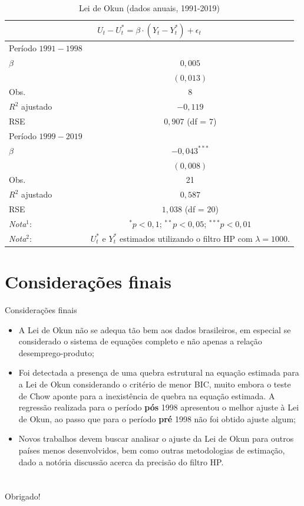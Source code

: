 \documentclass[11pt]{beamer}
\begin{document}
\begin{frame}

\begin{table}[H]
\centering
\caption*{Lei de Okun (dados anuais, 1991-2019)} 
\label{tab:quebra_estrutural}
\begin{tabular}{lc} \\ \multicolumn{2}{c}{$U_t - U_t^* = \beta \cdot (Y_t - Y_t^*) + \epsilon_t$
} \\ \toprule
Período $1991-1998$ &  \\
$\beta$ & $0,005$ \\
 & $(0,013)$ \\
Obs. & $8$ \\
$R^2$ ajustado & $-0,119$ \\
RSE & $0,907$ (df = $7$) \\ \midrule
Período $1999-2019$ &  \\
$\beta$ & $-0,043^{***}$ \\
 & $(0,008)$ \\
Obs. & 21 \\
$R^2$ ajustado & $0,587$ \\
RSE & $1,038$ (df = $20$) \\ \midrule
\textit{Nota}$^1$: & $^*p < 0,1$; $^{**}p < 0,05$; $^{***}p < 0,01$ \\ 
\textit{Nota}$^2$: & $U_t^*$ e $Y_t^*$ estimados utilizando o filtro HP com $\lambda = 1000$. \\
\end{tabular}
\end{table}

\end{frame}

\section{Considerações finais}

\begin{frame}{Considerações finais}

\begin{itemize}
    \item A Lei de Okun não se adequa tão bem aos dados brasileiros, em especial se considerado o sistema de equações completo e não apenas a relação desemprego-produto;
    \item Foi detectada a presença de uma quebra estrutural na equação estimada para a Lei de Okun considerando o critério de menor BIC, muito embora o teste de Chow aponte para a inexistência de quebra na equação estimada. A regressão realizada para o período \textbf{pós} 1998 apresentou o melhor ajuste à Lei de Okun, ao passo que para o período \textbf{pré} 1998 não foi obtido ajuste algum;
    \item Novos trabalhos devem buscar analisar o ajuste da Lei de Okun para outros países menos desenvolvidos, bem como outras metodologias de estimação, dado a notória discussão acerca da precisão do filtro HP.
\end{itemize}
    
\end{frame}

\section{}

\begin{frame}

\centering Obrigado!
    
\end{frame}
\end{document}
